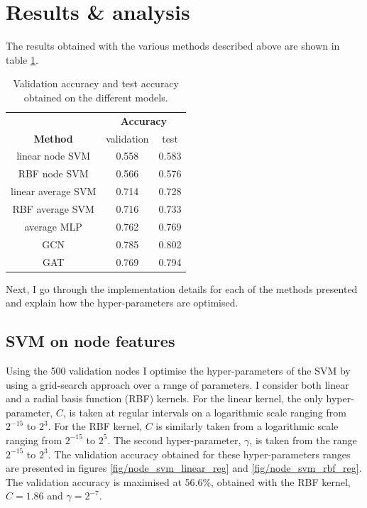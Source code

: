 \documentclass[12pt]{article}
\theoremstyle{definition}
\begin{document}
\section{Results \& analysis}
The results obtained with the various methods described above are shown in table \ref{table/all_results}.
\begin{table}[h]
\centering	
{\renewcommand{\arraystretch}{1.4} %
\begin{tabular}{ c| c c }
& \multicolumn{2}{c}{\textbf{Accuracy}} \\
\textbf{Method}  & validation & test \\
linear node SVM & 0.558 & 0.583 \\
RBF node SVM & 0.566 & 0.576 \\
\hline
linear average SVM & 0.714 & 0.728 \\
RBF average SVM & 0.716 & 0.733 \\
\hline
average MLP & 0.762 & 0.769 \\
\hline
GCN & 0.785 & 0.802 \\
\hline
GAT & 0.769 & 0.794 \\
\end{tabular}
}
\caption{Validation accuracy and test accuracy obtained on the different models.}
\label{table/all_results}
\end{table}

Next, I go through the implementation details for each of the methods presented  and explain how the hyper-parameters are optimised.

\subsection{SVM on node features}
Using the 500 validation nodes I optimise the hyper-parameters of the SVM by using a grid-search approach over a range of parameters. I consider both linear and a radial basis function (RBF) kernels. For the linear kernel, the only hyper-parameter, $C$, is taken at regular intervals on a logarithmic scale ranging from $2^{-15}$ to $2^3$. For the RBF kernel, $C$ is similarly taken from a logarithmic scale ranging from $2^{-15}$ to $2^5$. The second hyper-parameter, $\gamma$, is taken from the range $2^{-15}$ to $2^3$. The validation accuracy obtained for these hyper-parameters ranges are presented in figures \ref{fig/node_svm_linear_reg} and \ref{fig/node_svm_rbf_reg}. The validation accuracy is maximised at 56.6\%, obtained with the RBF kernel, $C=1.86$ and $\gamma=2^{-7}$. 
\end{document}
